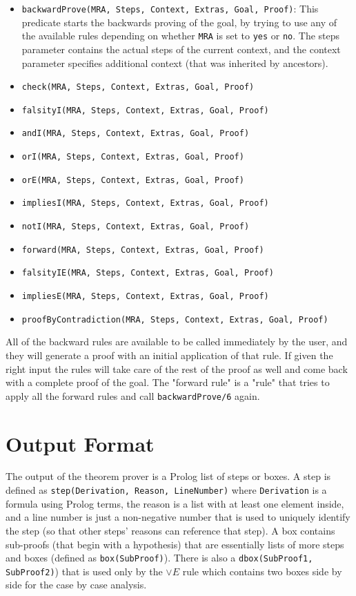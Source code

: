 \documentclass[11pt,twoside,a4paper]{report}
\begin{document}
\begin{itemize}
\item
\lstinline$backwardProve(MRA, Steps, Context, Extras, Goal, Proof)$: This predicate starts the backwards proving of the goal, by trying to use any of the available rules depending on whether \lstinline$MRA$ is set to \lstinline$yes$ or \lstinline$no$. The steps parameter contains the actual steps of the current context, and the context parameter specifies additional context (that was inherited by ancestors).
\item
\lstinline$check(MRA, Steps, Context, Extras, Goal, Proof)$
\item
\lstinline$falsityI(MRA, Steps, Context, Extras, Goal, Proof)$
\item
\lstinline$andI(MRA, Steps, Context, Extras, Goal, Proof)$
\item
\lstinline$orI(MRA, Steps, Context, Extras, Goal, Proof)$
\item
\lstinline$orE(MRA, Steps, Context, Extras, Goal, Proof)$
\item
\lstinline$impliesI(MRA, Steps, Context, Extras, Goal, Proof)$
\item
\lstinline$notI(MRA, Steps, Context, Extras, Goal, Proof)$
\item
\lstinline$forward(MRA, Steps, Context, Extras, Goal, Proof)$
\item
\lstinline$falsityIE(MRA, Steps, Context, Extras, Goal, Proof)$
\item
\lstinline$impliesE(MRA, Steps, Context, Extras, Goal, Proof)$
\item
\lstinline$proofByContradiction(MRA, Steps, Context, Extras, Goal, Proof)$
\end{itemize}

All of the backward rules are available to be called immediately by the user, and they will generate a proof with an initial application of that rule. If given the right input the rules will take care of the rest of the proof as well and come back with a complete proof of the goal. The "forward rule" is a "rule" that tries to apply all the forward rules and call \lstinline$backwardProve/6$ again.

\section{Output Format}
\label{sec:outputformat}
The output of the theorem prover is a Prolog list of steps or boxes. A step is defined as \lstinline$step(Derivation, Reason, LineNumber)$ where \lstinline$Derivation$ is a formula using Prolog terms, the reason is a list with at least one element inside, and a line number is just a non-negative number that is used to uniquely identify the step (so that other steps' reasons can reference that step). A box contains sub-proofs (that begin with a hypothesis) that are essentially lists of more steps and boxes (defined as \lstinline$box(SubProof)$). There is also a \lstinline$dbox(SubProof1, SubProof2)$) that is used only by the $\vee E$ rule which contains two boxes side by side for the case by case analysis.
\end{document}
